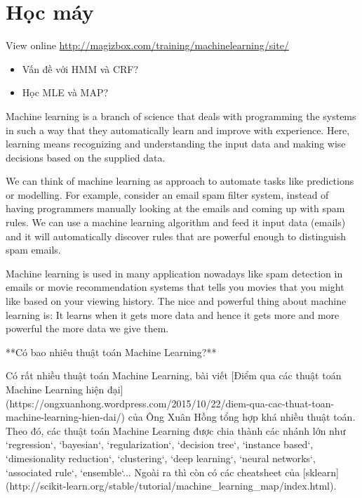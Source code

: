 \chapter{Học máy}

View online \href{http://magizbox.com/training/machinelearning/site/}{http://magizbox.com/training/machinelearning/site/}

\begin{itemize}
  \item Vấn đề với HMM và CRF?
  \item Học MLE và MAP?
\end{itemize}



Machine learning is a branch of science that deals with programming the systems in such a way that they automatically learn and improve with experience. Here, learning means recognizing and understanding the input data and making wise decisions based on the supplied data.

We can think of machine learning as approach to automate tasks like predictions or modelling. For example, consider an email spam filter system, instead of having programmers manually looking at the emails and coming up with spam rules. We can use a machine learning algorithm and feed it input data (emails) and it will automatically discover rules that are powerful enough to distinguish spam emails.

Machine learning is used in many application nowadays like spam detection in emails or movie recommendation systems that tells you movies that you might like based on your viewing history. The nice and powerful thing about machine learning is: It learns when it gets more data and hence it gets more and more powerful the more data we give them.

**Có bao nhiêu thuật toán Machine Learning?**

Có rất nhiều thuật toán Machine Learning, bài viết [Điểm qua các thuật toán Machine Learning hiện đại](https://ongxuanhong.wordpress.com/2015/10/22/diem-qua-cac-thuat-toan-machine-learning-hien-dai/) của Ông Xuân Hồng tổng hợp khá nhiều thuật toán. Theo đó, các thuật toán Machine Learning được chia thành các nhánh lớn như `regression`, `bayesian`, `regularization`, `decision tree`, `instance based`, `dimesionality reduction`, `clustering`, `deep learning`, `neural networks`, `associated rule`, `ensemble`... Ngoài ra thì còn có các cheatsheet của [sklearn](http://scikit-learn.org/stable/tutorial/machine_learning_map/index.html).

